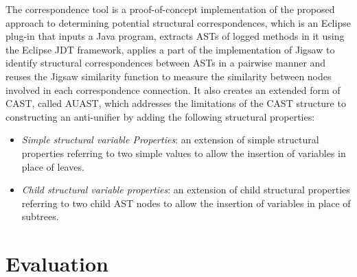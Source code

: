 
The correspondence tool is a proof-of-concept implementation of the proposed approach to determining potential structural correspondences, which is an Eclipse plug-in that inputs a Java program, extracts ASTs of logged methods in it using the Eclipse JDT framework, applies a part of the implementation of Jigsaw to identify structural correspondences between ASTs in a pairwise manner and reuses the Jigsaw similarity function to measure the similarity between nodes involved in each correspondence connection. It also creates an extended form of CAST, called AUAST, which  addresses the limitations of the CAST structure to constructing an anti-unifier by adding the following structural properties:

\begin{itemize} [leftmargin=.5in]
\item \textit{Simple structural variable Properties}: an extension of simple structural properties referring to two simple values to allow the insertion of variables in place of leaves.
\end{itemize}
\begin{itemize} [leftmargin=.5in]
\item \textit{Child structural variable properties}: an extension of child structural properties referring to two child AST nodes to allow the insertion of variables in place of subtrees.
\end{itemize}






\section{Evaluation}\label{jigsaw-assessment}

